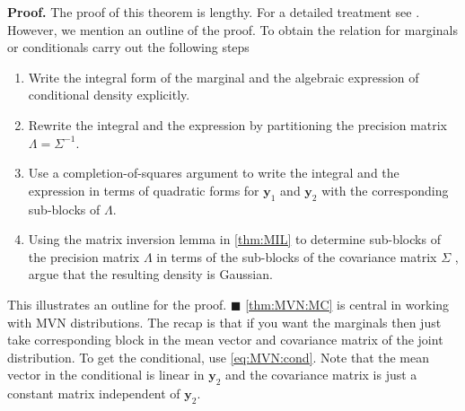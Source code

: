 \documentclass[10pt]{article}
\theoremstyle{definition}
\theoremstyle{definition}
\theoremstyle{remark}
\newenvironment{prf}{\noindent\textbf{Proof.}}{\hfill$\blacksquare$}
\begin{document}
\begin{prf}
The proof of this theorem is lengthy. For a detailed treatment see \cite{Do2009}. However, we mention an outline of the proof. To obtain the relation for marginals or conditionals carry out the following steps
\begin{enumerate}[noitemsep]
\item Write the integral form of the marginal and the algebraic expression of conditional density explicitly.
\item Rewrite the integral and the expression by partitioning the precision matrix $\mathsf{\Lambda}=\mathsf{\Sigma}^{-1}$.
\item Use a completion-of-squares argument to write the integral and the expression in terms of quadratic forms for $\mathbf{y}_1$ and $\mathbf{y}_2$ with the corresponding sub-blocks of $\mathsf{\Lambda}$.
\item Using the matrix inversion lemma in \cref{thm:MIL} to determine sub-blocks of the precision matrix $\mathsf{\Lambda}$ in terms of the sub-blocks of the covariance matrix $\mathsf{\Sigma}$ , argue that the resulting density is Gaussian.
\end{enumerate}
This illustrates an outline for the proof.
\end{prf}
\newline
\cref{thm:MVN:MC} is central in working with MVN distributions. The recap is that if you want the marginals then just take corresponding block in the mean vector and covariance matrix of the joint distribution. To get the conditional, use \cref{eq:MVN:cond}. Note that the mean vector in the conditional is linear in $\mathbf{y}_2$ and the covariance matrix is just a constant matrix independent of $\mathbf{y}_2$.
\end{document}
